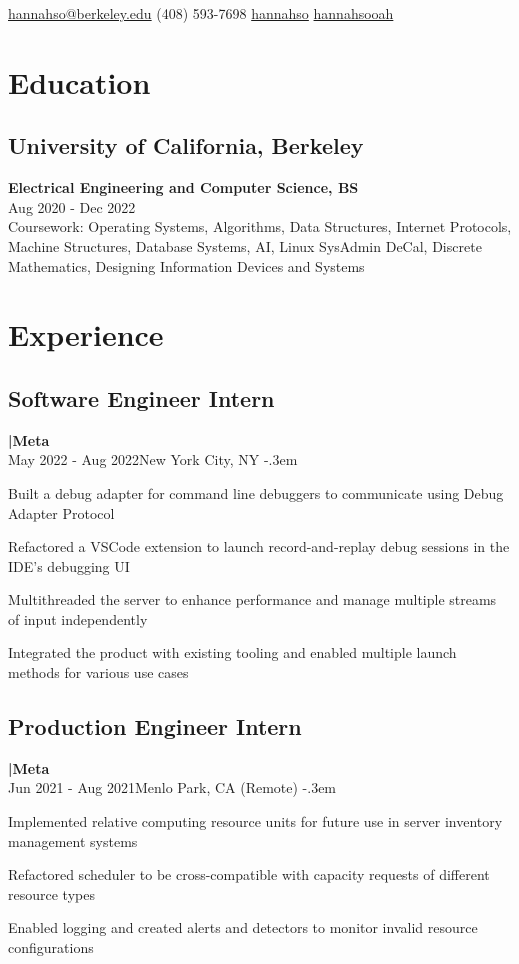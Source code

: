 \documentclass{article}
\makeatletter
\def\faEmail{{\FAFR \symbol{"F0E0}}} %
\def\faPhone{{\FAFR \symbol{"F095}}} %
\def\faLinkedin{{\FAB \symbol{"F08C}}} %
\def\faGithub{{\FAB \symbol{"F09B}}} %
\let\olditemize=\itemize \let\endolditemize=\enditemize
\renewenvironment{itemize}{\olditemize[topsep=0em] \itemsep-.3em}{\endolditemize}
\newcommand{\entry}[3]{\quad\textbf{|\quad#1}\\#2\qquad#3}
\renewcommand{\maketitle}{
  \begin{flushleft}
    \Huge\bfseries\theauthor
  \end{flushleft}
  \begin{bfseries}
    \faEmail    \hspace{1pt} \href{mailto:hannahso@berkeley.edu}{hannahso@berkeley.edu} \quad
    \faPhone    \hspace{1pt} (408) 593-7698 \quad
    \faLinkedin \hspace{1pt} \href{https://www.linkedin.com/in/hannahso}{hannahso} \quad
    \faGithub   \hspace{1pt} \href{https://github.com/hannahsooah/}{hannahsooah}
  \end{bfseries}
}
\makeatother
\begin{document}
\author{\color{titlecolor}Hannah S. Oh}
\maketitle


\section{Education}
\subsection{University of California, Berkeley}\quad\textbf{Electrical Engineering and Computer Science, BS}\\
{Aug 2020 - Dec 2022}\\
Coursework:
  Operating Systems,
  Algorithms,
  Data Structures,
  Internet Protocols,
  Machine Structures,
  Database Systems,
  AI, 
  Linux SysAdmin DeCal,
  Discrete Mathematics,
  Designing Information Devices and Systems


\section{Experience}

\subsection{Software Engineer Intern}
\entry{Meta}{May 2022 - Aug 2022}{New York City, NY}
\begin{itemize}
  \item Built a debug adapter for command line debuggers to communicate using Debug Adapter Protocol
  \item Refactored a VSCode extension to launch record-and-replay debug sessions in the IDE's debugging UI
  \item Multithreaded the server to enhance performance and manage multiple streams of input independently
  \item Integrated the product with existing tooling and enabled multiple launch methods for various use cases
\end{itemize}

\subsection{Production Engineer Intern}
\entry{Meta}{Jun 2021 - Aug 2021}{Menlo Park, CA (Remote)}
\begin{itemize}
  \item Implemented relative computing resource units for future use in server inventory management systems
  \item Refactored scheduler to be cross-compatible with capacity requests of different resource types
  \item Enabled logging and created alerts and detectors to monitor invalid resource configurations
\end{itemize}
\end{document}
